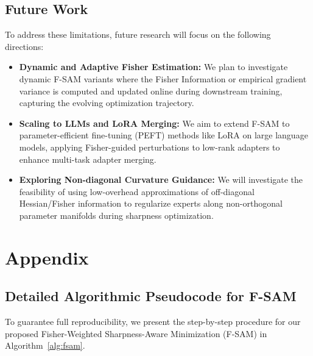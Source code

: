 \documentclass{article}
\theoremstyle{plain}
\theoremstyle{definition}
\theoremstyle{remark}
\begin{document}
\subsection{Future Work}
To address these limitations, future research will focus on the following directions:
\begin{itemize}\setlength{\itemsep}{0pt}\setlength{\parskip}{0pt}\setlength{\parsep}{0pt}
    \item \textbf{Dynamic and Adaptive Fisher Estimation:} We plan to investigate dynamic F-SAM variants where the Fisher Information or empirical gradient variance is computed and updated online during downstream training, capturing the evolving optimization trajectory.
    \item \textbf{Scaling to LLMs and LoRA Merging:} We aim to extend F-SAM to parameter-efficient fine-tuning (PEFT) methods like LoRA on large language models, applying Fisher-guided perturbations to low-rank adapters to enhance multi-task adapter merging.
    \item \textbf{Exploring Non-diagonal Curvature Guidance:} We will investigate the feasibility of using low-overhead approximations of off-diagonal Hessian/Fisher information to regularize experts along non-orthogonal parameter manifolds during sharpness optimization.
\end{itemize}




\newpage
\appendix
\onecolumn
\section{Appendix}

\subsection{Detailed Algorithmic Pseudocode for F-SAM}
To guarantee full reproducibility, we present the step-by-step procedure for our proposed Fisher-Weighted Sharpness-Aware Minimization (F-SAM) in Algorithm~\ref{alg:fsam}.
\end{document}
